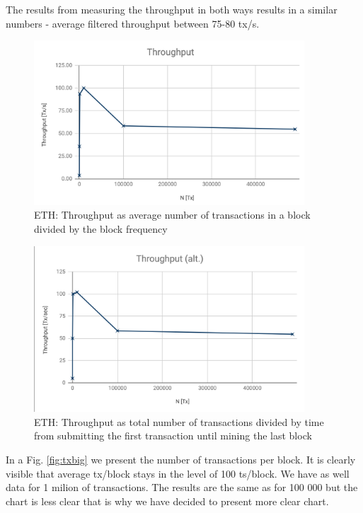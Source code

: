  
The results from measuring the throughput in both ways results in a similar numbers - average filtered throughput between 75-80 tx/s. 

\begin{figure}[h]
    \centering
    \includegraphics[width=0.9\textwidth]{img/Throughput_ETH.png}
    \caption{ETH: Throughput as average number of transactions in a block divided by the block frequency}
    \label{fig:throughput1}
\end{figure}

\begin{figure}[h]
    \centering
    \includegraphics[width=0.9\textwidth]{img/Throughputalt.png}
    \caption{ETH: Throughput as total number of transactions divided by time from submitting the first transaction until mining the last block}
    \label{fig:throughput2}
\end{figure}

In a Fig. \ref{fig:txbig} we present the number of transactions per block. It is clearly visible that average tx/block stays in the level of 100 ts/block. We have as well data for 1 milion of transactions. The results are the same as for 100 000 but the chart is less clear that is why we have decided to present more clear chart.






